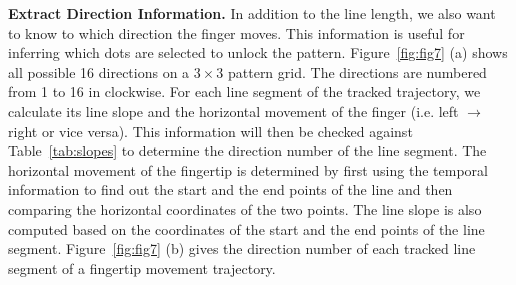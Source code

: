         \vspace{2mm}
       \noindent \textbf{Extract Direction Information.}
       In addition to the line length, we also want to know to which
       direction the finger moves. This information is useful for inferring which dots are selected to unlock the pattern.
       Figure~\ref{fig:fig7} (a) shows all possible 16
        directions on a $3 \times 3$ pattern grid. The
        directions are numbered from 1 to 16 in clockwise.
        For each line segment of the tracked trajectory, we calculate its line slope and the horizontal movement of the finger (i.e. left $\rightarrow$ right or vice versa).
        This information will then be checked against Table~\ref{tab:slopes} to determine the direction number of the line segment.
         The horizontal movement of the fingertip is determined by first using the temporal information to find out the start and the end points of the line and then comparing the horizontal coordinates of the two points.
        The line slope is also computed based on the coordinates of the
       start and the end points of the
        line segment.
        Figure~\ref{fig:fig7} (b) gives the direction number of each
        tracked line segment of a fingertip movement trajectory.

